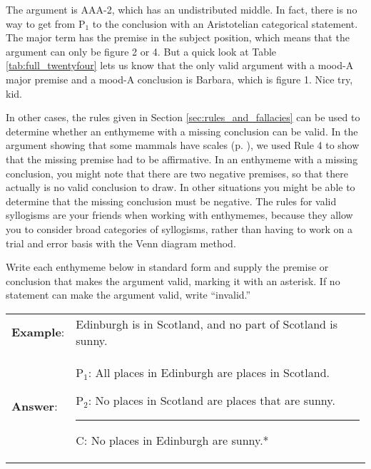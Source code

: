 The argument is AAA-2, which has an undistributed middle. In fact, there is no way to get from P$_1$ to the conclusion with an Aristotelian categorical statement. The major term has the premise in the subject position, which means that the argument can only be figure 2 or 4. But a quick look at Table \ref{tab:full_twentyfour} lets us know that the only valid argument with a mood-A major premise and a mood-A conclusion is Barbara, which is figure 1. Nice try, kid. 

In other cases, the rules given in Section \ref{sec:rules_and_fallacies} can be used to determine whether an enthymeme with a missing conclusion can be valid. In the argument showing that some mammals have scales (p. \pageref{rule_use}), we used Rule 4 to show that the missing premise had to be affirmative. In an enthymeme with a missing conclusion, you might note that there are two negative premises, so that there actually is no valid conclusion to draw. In other situations you might be able to determine that the missing conclusion must be negative. The rules for valid syllogisms are your friends when working with enthymemes, because they allow you to consider broad categories of syllogisms, rather than having to work on a trial and error basis with the Venn diagram method.

\practiceproblems
\noindent \problempart Write each enthymeme below in standard form and supply the premise or conclusion that makes the argument valid, marking it with an asterisk. If no statement can make the argument valid, write ``invalid.''

\begin{longtabu}{p{.1\linewidth}p{.9\linewidth}}
\textbf{Example}: & Edinburgh is in Scotland, and no part of Scotland is sunny. \\
\textbf{Answer}: & 
\vspace{-16pt}
\begin{earg}
\item[P$_1$:] All places in Edinburgh are places in Scotland.
\item[P$_2$:] No places in Scotland are places that are sunny.
\vspace{-.5em}
\item [] \rule{0.6\linewidth}{.5pt} 
\item[C:] No places in Edinburgh are sunny.* 
\end{earg} 
\end{longtabu}



